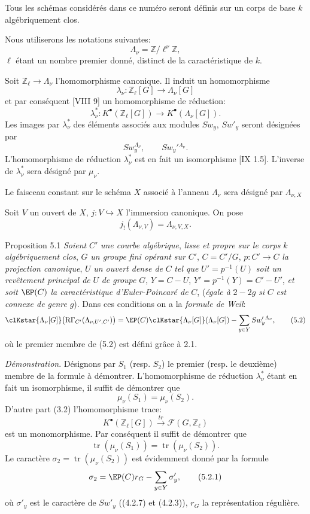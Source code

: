 Tous les schémas considérés dans ce numéro seront définis sur un corps de base $k$ algébriquement clos.

Nous utiliserons les notations suivantes:
\[
\Lambda_\nu=\mathbb{Z}/\ell^\nu\mathbb{Z},
\]
$\ell$ étant un nombre premier donné, distinct de la caractéristique de $k$.

Soit $\mathbb{Z}_\ell\to\Lambda_\nu$ l'homomorphisme canonique. Il induit un homomorphisme
\[
\lambda_\nu:\mathbb{Z}_\ell[G]\longrightarrow \Lambda_\nu[G]
\]
et par conséquent [VIII 9] un homomorphisme de réduction:
\[
\lambda_\nu^*:K^{\bullet}(\mathbb{Z}_\ell[G])\longrightarrow K^{\bullet}(\Lambda_\nu[G]).
\]
Les images par $\lambda_\nu^*$ des éléments associés aux modules $Sw_y$, $Sw'_y$ seront désignées par
\[
Sw_y^{\Lambda_\nu},\qquad Sw_y'{}^{\Lambda_\nu}.
\]
L'homomorphisme de réduction $\lambda_\nu^*$ est en fait un isomorphisme [IX 1.5]. L'inverse de $\lambda_\nu^*$ sera désigné par $\mu_\nu$.

Le faisceau constant sur le schéma $X$ associé à l'anneau $\Lambda_\nu$ sera désigné par $\Lambda_{\nu,X}$

Soit $V$ un ouvert de $X$, $j:V\hookrightarrow X$ l'immersion canonique. On pose
\[
j_!(\Lambda_{\nu,V})=\Lambda_{\nu,V,X}.
\]

\begin{statement}{Proposition 5.1}
\emph{Soient} $C'$ \emph{une courbe algébrique}, \emph{lisse et propre sur le corps} $k$ \emph{algébriquement clos}, $G$ \emph{un groupe fini opérant sur} $C'$, $C=C'/G$, $p:C'\to C$ \emph{la projection canonique}, $U$ \emph{un ouvert dense de} $C$ \emph{tel que} $U'=p^{-1}(U)$ \emph{soit un revêtement principal de} $U$ \emph{de groupe} $G$, $Y=C-U$, $Y'=p^{-1}(Y)=C'-U'$, \emph{et soit} $\EP(C)$ \emph{la caractéristique d'Euler-Poincaré de} $C$, (\emph{égale à} $2-2g$ \emph{si} $C$ \emph{est connexe de genre} $g$).
Dans ces conditions on a la \emph{formule de Weil}:
\[
\clKstar{\Lambda_\nu[G]}\bigl(\mathrm{R}\Gamma_{C'}(\Lambda_{\nu,U',C'})\bigr)
=
\EP(C)\clKstar{\Lambda_\nu[G]}(\Lambda_\nu[G])
-\sum_{y\in Y}Sw_y'{}^{\Lambda_\nu},
\tag{5.2}
\]
où le premier membre de (5.2) est défini grâce à 2.1.
\end{statement}

\emph{Démonstration}. Désignons par $S_1$ (resp. $S_2$) le premier (resp. le deuxième) membre de la formule à démontrer. L'homomorphisme de réduction $\lambda_\nu^*$ étant en fait un isomorphisme, il suffit de démontrer que
\[
\mu_\nu(S_1)=\mu_\nu(S_2).
\]
D'autre part (3.2) l'homomorphisme trace:
\[
K^{\bullet}(\mathbb{Z}_\ell[G])\xrightarrow{\ tr\ }\mathcal{F}(G,\mathbb{Z}_\ell)
\]
est un monomorphisme. Par conséquent il suffit de démontrer que
\[
\operatorname{tr}(\mu_\nu(S_1))=\operatorname{tr}(\mu_\nu(S_2)).
\]
Le caractère $\sigma_2=\operatorname{tr}(\mu_\nu(S_2))$ est évidemment donné par la
formule
\[
\sigma_2=\EP(C)r_G-\sum_{y\in Y}\sigma'_y,
\tag{5.2.1}
\]
où $\sigma'_y$ est le caractère de $Sw'_y$ ((4.2.7) et (4.2.3)), $r_G$ la représentation régulière.

